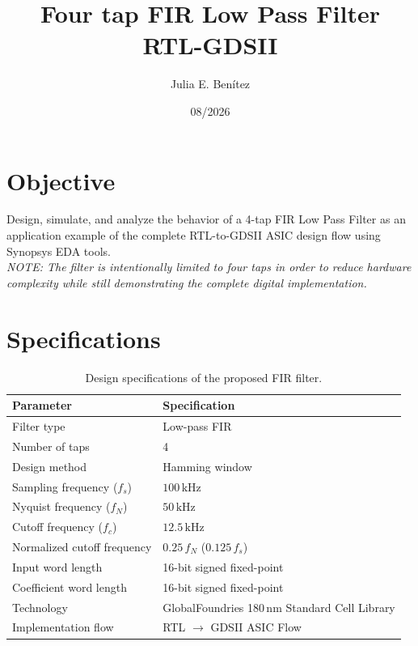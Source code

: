 \documentclass[12 pt]{article}
\date{08/2026}
\title{\textbf{\LARGE Four tap FIR Low Pass Filter} \\ RTL-GDSII  \vspace{8cm}}
\author{ Julia E. Benítez }
\begin{document}
	\maketitle
	\newpage
	
	\section{Objective}
	Design, simulate, and analyze the behavior of a 4-tap FIR Low Pass Filter as an application example of the complete RTL-to-GDSII ASIC design flow using Synopsys EDA tools. \\ 
	
\textit{	NOTE: The filter is intentionally limited to four taps in order to reduce hardware complexity while still demonstrating the complete digital implementation.}
	
	\section{Specifications}
	
	\begin{table}[H]
		
		\centering
		\label{tab:fir_specs}
		\begin{tabular}{ll}
			\toprule
			\textbf{Parameter} & \textbf{Specification} \\
			\midrule
			Filter type & Low-pass FIR \\
			Number of taps & 4 \\
			Design method & Hamming window \\
			Sampling frequency ($f_s$) & $100\,\mathrm{kHz}$ \\
			Nyquist frequency ($f_N$)& $50\,\mathrm{kHz}$ \\
			Cutoff frequency ($f_c$) & $12.5\,\mathrm{kHz}$ \\
			Normalized cutoff frequency & $0.25\,f_N$ ($0.125\,f_s$) \\
			Input word length & 16-bit signed fixed-point \\
			Coefficient word length & 16-bit signed fixed-point \\
			Technology & GlobalFoundries 180\,nm Standard Cell Library \\
			Implementation flow & RTL $\rightarrow$ GDSII ASIC Flow \\
			\bottomrule
		\end{tabular}
			\caption{Design specifications of the proposed FIR filter.}
	\end{table}
	
\end{document}
